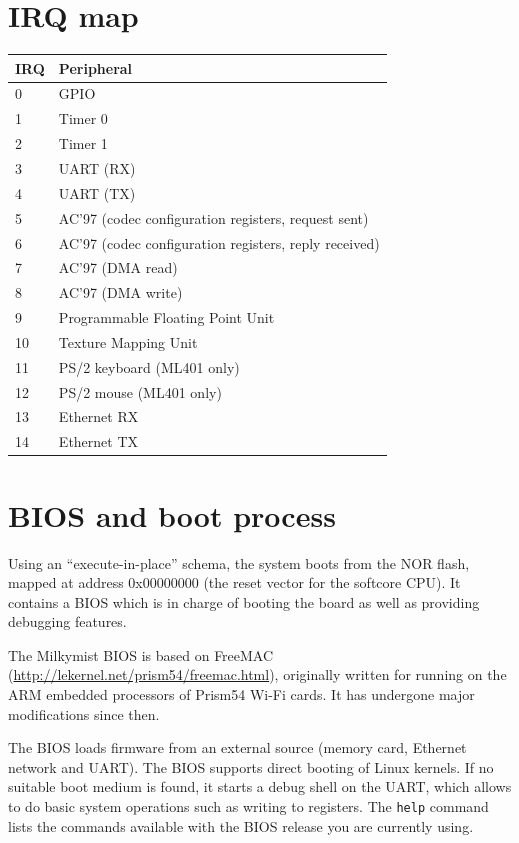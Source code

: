\documentclass[a4paper,11pt]{article}
\begin{document}
\section{IRQ map}
\begin{tabularx}{\textwidth}{|l|X|}
\hline
\bf{IRQ} & \bf{Peripheral} \\
\hline
0 & GPIO \\
\hline
1 & Timer 0 \\
\hline
2 & Timer 1 \\
\hline
3 & UART (RX)\\
\hline
4 & UART (TX)\\
\hline
5 & AC'97 (codec configuration registers, request sent)\\
\hline
6 & AC'97 (codec configuration registers, reply received)\\
\hline
7 & AC'97 (DMA read)\\
\hline
8 & AC'97 (DMA write)\\
\hline
9 & Programmable Floating Point Unit\\
\hline
10 & Texture Mapping Unit\\
\hline
11 & PS/2 keyboard (ML401 only)\\
\hline
12 & PS/2 mouse (ML401 only)\\
\hline
13 & Ethernet RX \\
\hline
14 & Ethernet TX \\
\hline
\end{tabularx}

\section{BIOS and boot process}
Using an ``execute-in-place'' schema, the system boots from the NOR flash, mapped at address 0x00000000 (the reset vector for the softcore CPU). It contains a BIOS which is in charge of booting the board as well as providing debugging features.

The Milkymist BIOS is based on FreeMAC (\url{http://lekernel.net/prism54/freemac.html}), originally written for running on the ARM embedded processors of Prism54 Wi-Fi cards. It has undergone major modifications since then.

The BIOS loads firmware from an external source (memory card, Ethernet network and UART). The BIOS supports direct booting of Linux kernels. If no suitable boot medium is found, it starts a debug shell on the UART, which allows to do basic system operations such as writing to registers. The \verb!help! command lists the commands available with the BIOS release you are currently using.
\end{document}
